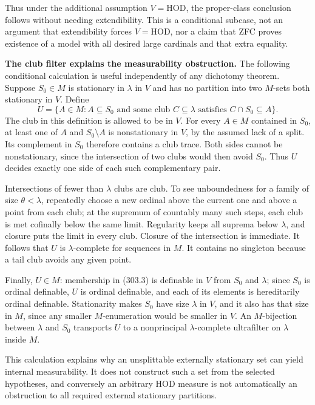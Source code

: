 \documentclass[11pt]{article}
\begin{document}
Thus under the additional assumption $V=\mathrm{HOD}$, the proper-class conclusion follows without needing extendibility. This is a conditional subcase, not an argument that extendibility forces $V=\mathrm{HOD}$, nor a claim that ZFC proves existence of a model with all desired large cardinals and that extra equality.

\textbf{The club filter explains the measurability obstruction.} The following conditional calculation is useful independently of any dichotomy theorem. Suppose $S_0\in M$ is stationary in $\lambda$ in $V$ and has no partition into two $M$-sets both stationary in $V$. Define
\[
 U=\{A\in M:A\subseteq S_0\text{ and some club }C\subseteq\lambda
                    \text{ satisfies }C\cap S_0\subseteq A\}.
 \tag{303.3}
\]
The club in this definition is allowed to be in $V$. For every $A\in M$ contained in $S_0$, at least one of $A$ and $S_0\setminus A$ is nonstationary in $V$, by the assumed lack of a split. Its complement in $S_0$ therefore contains a club trace. Both sides cannot be nonstationary, since the intersection of two clubs would then avoid $S_0$. Thus $U$ decides exactly one side of each such complementary pair.

Intersections of fewer than $\lambda$ clubs are club. To see unboundedness for a family of size $\theta<\lambda$, repeatedly choose a new ordinal above the current one and above a point from each club; at the supremum of countably many such steps, each club is met cofinally below the same limit. Regularity keeps all suprema below $\lambda$, and closure puts the limit in every club. Closure of the intersection is immediate. It follows that $U$ is $\lambda$-complete for sequences in $M$. It contains no singleton because a tail club avoids any given point.

Finally, $U\in M$: membership in (303.3) is definable in $V$ from $S_0$ and $\lambda$; since $S_0$ is ordinal definable, $U$ is ordinal definable, and each of its elements is hereditarily ordinal definable. Stationarity makes $S_0$ have size $\lambda$ in $V$, and it also has that size in $M$, since any smaller $M$-enumeration would be smaller in $V$. An $M$-bijection between $\lambda$ and $S_0$ transports $U$ to a nonprincipal $\lambda$-complete ultrafilter on $\lambda$ inside $M$.

This calculation explains why an unsplittable externally stationary set can yield internal measurability. It does not construct such a set from the selected hypotheses, and conversely an arbitrary HOD measure is not automatically an obstruction to all required external stationary partitions.
\end{document}
